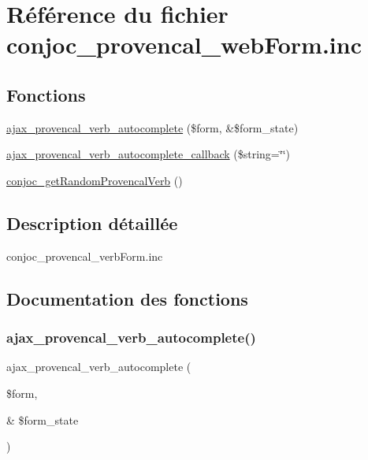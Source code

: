 \hypertarget{conjoc__provencal__web_form_8inc}{}\section{Référence du fichier conjoc\+\_\+provencal\+\_\+web\+Form.\+inc}
\label{conjoc__provencal__web_form_8inc}
\subsection*{Fonctions}
\begin{DoxyCompactItemize}
\item 
\hyperlink{conjoc__provencal__web_form_8inc_aac31f536bfd83a81f1ea012f5ecdc9ad}{ajax\+\_\+provencal\+\_\+verb\+\_\+autocomplete} (\$form, \&\$form\+\_\+state)
\item 
\hyperlink{conjoc__provencal__web_form_8inc_a2f2da1c5cc327e80252b73dd250aa363}{ajax\+\_\+provencal\+\_\+verb\+\_\+autocomplete\+\_\+callback} (\$string=\char`\"{}\char`\"{})
\item 
\hyperlink{conjoc__provencal__web_form_8inc_a8e95bdf8c2d2a450e6485d589788aa83}{conjoc\+\_\+get\+Random\+Provencal\+Verb} ()
\end{DoxyCompactItemize}


\subsection{Description détaillée}
conjoc\+\_\+provencal\+\_\+verb\+Form.\+inc 

\subsection{Documentation des fonctions}
\hypertarget{conjoc__provencal__web_form_8inc_aac31f536bfd83a81f1ea012f5ecdc9ad}{}\label{conjoc__provencal__web_form_8inc_aac31f536bfd83a81f1ea012f5ecdc9ad} 
\subsubsection{\texorpdfstring{ajax\+\_\+provencal\+\_\+verb\+\_\+autocomplete()}{ajax\_provencal\_verb\_autocomplete()}}
{\footnotesize\ttfamily ajax\+\_\+provencal\+\_\+verb\+\_\+autocomplete (\begin{DoxyParamCaption}\item[{}]{\$form,  }\item[{\&}]{\$form\+\_\+state }\end{DoxyParamCaption})}


